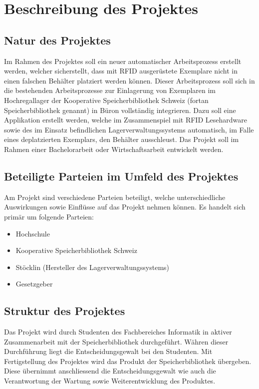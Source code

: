 \chapter{Beschreibung des Projektes}

\section{Natur des Projektes}
Im Rahmen des Projektes soll ein neuer automatischer Arbeitsprozess erstellt werden, welcher sicherstellt, dass mit RFID ausgerüstete Exemplare nicht in einen falschen Behälter platziert werden können. Dieser Arbeitsprozess soll sich in die bestehenden Arbeitsprozesse zur Einlagerung von Exemplaren im Hochregallager der Kooperative Speicherbibliothek Schweiz (fortan Speicherbibliothek genannt) in Büron vollständig integrieren. Dazu soll eine Applikation erstellt werden, welche im Zusammenspiel mit RFID Lesehardware sowie des im Einsatz befindlichen Lagerverwaltungssystems automatisch, im Falle eines deplatzierten Exemplars, den Behälter ausschleust. Das Projekt soll im Rahmen einer Bachelorarbeit oder Wirtschaftsarbeit entwickelt werden.

\section{Beteiligte Parteien im Umfeld des Projektes}
Am Projekt sind verschiedene Parteien beteiligt, welche unterschiedliche Auswirkungen sowie Einflüsse auf das Projekt nehmen können. Es handelt sich primär um folgende Parteien:
\begin{itemize}
	\item Hochschule
	\item Kooperative Speicherbibliothek Schweiz
	\item Stöcklin (Hersteller des Lagerverwaltungssystems)
	\item Gesetzgeber
\end{itemize}

\section{Struktur des Projektes}
Das Projekt wird durch Studenten des Fachbereiches Informatik in aktiver Zusammenarbeit mit der Speicherbibliothek durchgeführt. Währen dieser Durchführung liegt die Entscheidungsgewalt bei den Studenten. Mit Fertigstellung des Projektes wird das Produkt der Speicherbibliothek übergeben. Diese übernimmt anschliessend die Entscheidungsgewalt wie auch die Verantwortung der Wartung sowie Weiterentwicklung des Produktes.

